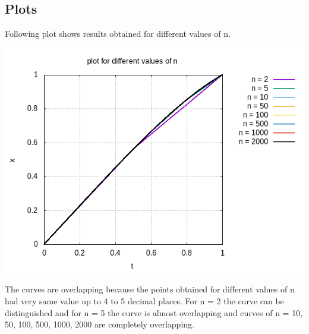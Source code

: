 \documentclass[12pt]{article}
\begin{document}
    \subsection{Plots}
        Following plot shows results obtained for different values of n.
        \begin{center}
            \includegraphics[scale=0.7]{Plots/plot_x(t).png}
        \end{center}
        The curves are overlapping because the points obtained for different values of n had very same value up to 4 to 5 decimal places. For n = 2 the curve can be distinguished and for n = 5 the curve is almost overlapping and curves of n = 10, 50, 100, 500, 1000, 2000 are completely overlapping.\\
\end{document}
